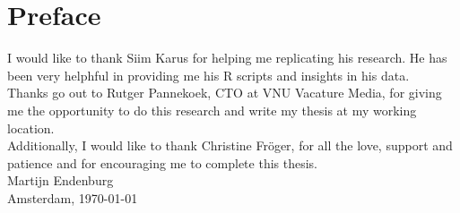 \chapter*{Preface}

I would like to thank Siim Karus for helping me replicating his research. He has
been very helphful in providing me his R scripts and insights in his data.\\

\noindent
Thanks go out to Rutger Pannekoek, CTO at VNU Vacature Media, for giving me the
opportunity to do this research and write my thesis at my working location.\\

\noindent
Additionally, I would like to thank Christine Fr\"{o}ger, for all the love,
support and patience and for encouraging me to complete this thesis.\\[0.8cm]

\noindent
Martijn Endenburg\\
Amsterdam, \today
